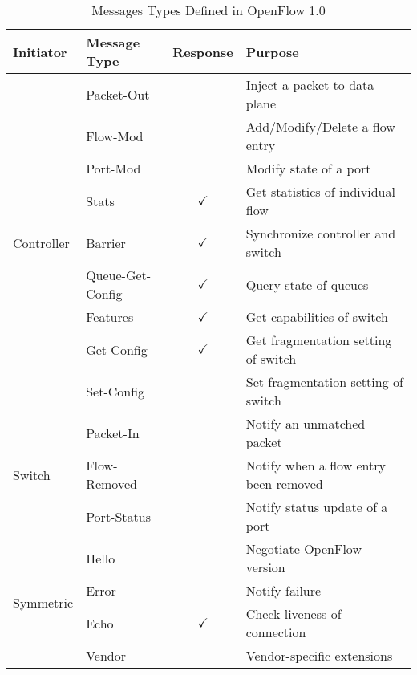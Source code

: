 \begin{table}[t]
\centering
\caption{Messages Types Defined in OpenFlow 1.0}%
\label{tbl:openflow-messages}
\begin{tabular}{@{}llcl@{}}
\toprule
Initiator                   & Message Type     & Response     & Purpose                               \\ \midrule
\multirow{9}{*}{Controller} & Packet-Out       &              & Inject a packet to data plane         \\
                            & Flow-Mod         &              & Add/Modify/Delete a flow entry        \\
                            & Port-Mod         &              & Modify state of a port                \\
                            & Stats            & $\checkmark$ & Get statistics of individual flow     \\
                            & Barrier          & $\checkmark$ & Synchronize controller and switch     \\
                            & Queue-Get-Config & $\checkmark$ & Query state of queues                 \\
                            & Features         & $\checkmark$ & Get capabilities of switch            \\
                            & Get-Config       & $\checkmark$ & Get fragmentation setting of switch   \\
                            & Set-Config       &              & Set fragmentation setting of switch   \\ \midrule
\multirow{3}{*}{Switch}     & Packet-In        &              & Notify an unmatched packet            \\
                            & Flow-Removed     &              & Notify when a flow entry been removed \\
                            & Port-Status      &              & Notify status update of a port        \\ \midrule
\multirow{4}{*}{Symmetric}  & Hello            &              & Negotiate OpenFlow version            \\
                            & Error            &              & Notify failure                        \\
                            & Echo             & $\checkmark$ & Check liveness of connection          \\
                            & Vendor           &              & Vendor-specific extensions            \\ \bottomrule
\end{tabular}
\end{table}

